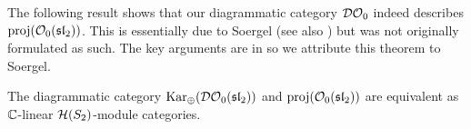 The following result shows that our diagrammatic category $\mathcal{DO}_0$ indeed describes $\operatorname{proj}(\mathcal{O}_0(\operatorname{\mathfrak{sl}}_2))$.  This is essentially due to Soergel \cite[Endomorhihsmensatz 7, Struktursatz 9 and Section 2.4]{soergel-category-O} (see also \cite{soergel-combinatorics-of-hcbim}) but was not originally formulated as such. The key arguments are in \cite{soergel-category-O} so we attribute this theorem to Soergel.


\begin{theorem}
    The diagrammatic category $\operatorname{Kar_\oplus}(\mathcal{DO}_0(\operatorname{\mathfrak{sl}}_2))$ and $\operatorname{proj}(\mathcal{O}_0(\operatorname{\mathfrak{sl}}_2))$ are equivalent as $\mathbb{C}$-linear $\mathcal{H}(S_2)$-module categories.
\end{theorem}



